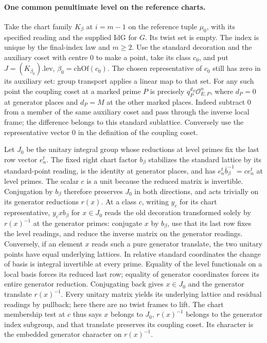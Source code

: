 \paragraph{One common penultimate level on the reference charts.}
Take the chart family $K_\beta$ at $i=m-1$ on the reference tuple
$\mu_0$, with its specified reading and the supplied $\mathrm{IdG}$
for $G$. Its twist set is empty. The index is unique by the final-index
law and $m\ge2$. Use the standard decoration and the auxiliary coset
with centre $0$ to make a point, take its class $c_0$, and put
$J=(K_{\beta_0}).\mathrm{lev}$, $\beta_0=\mathrm{chOf}(c_0)$.
The chosen representative of $c_0$ still has zero in its auxiliary set:
group transport applies a linear map to that set. For any such point
the coupling coset at a marked prime $P$ is precisely
$q_P^{d_P}\mathcal O_{E,P}^n$, where $d_P=0$ at generator places and
$d_P=M$ at the other marked places. Indeed subtract $0$ from a member
of the same auxiliary coset and pass through the inverse local frame;
the difference belongs to this standard sublattice. Conversely use
the representative vector $0$ in the definition of the coupling coset.

Let $J_0$ be the unitary integral group whose reductions at level
primes fix the last row vector $e_n^t$. The fixed right chart factor
$b_\beta$ stabilizes the standard lattice by its standard-point
reading, is the identity at generator places, and has
$e_n^t\bar b_\beta^{-1}=c e_n^t$ at level primes. The scalar $c$ is
a unit because the reduced matrix is invertible. Conjugation by
$b_\beta$ therefore preserves $J_0$ in both directions, and acts
trivially on its generator reductions $r(x)$. At a class $c$, writing
$y_c$ for its chart representative, $y_c x b_\beta$ for $x\in J_0$
reads the old decoration transformed solely by $r(x)^{-1}$ at the
generator primes: conjugate $x$ by $b_\beta$, use that its last row
fixes the level readings, and reduce the inverse matrix on the
generator readings. Conversely, if an element $x$ reads such a pure
generator translate, the two unitary points have equal underlying
lattices. In relative standard coordinates the change of basis is
integral invertible at every prime. Equality of the level functionals
on a local basis forces its reduced last row; equality of generator
coordinates forces its entire generator reduction. Conjugating back
gives $x\in J_0$ and the generator translate $r(x)^{-1}$.
Every unitary matrix yields its underlying lattice and residual
readings by pullback; here there are no twist frames to lift.
The chart membership test at $c$ thus says $x$ belongs to $J_0$,
$r(x)^{-1}$ belongs to the generator index subgroup, and that
translate preserves its coupling coset. Its character is the embedded
generator character on $r(x)^{-1}$.

